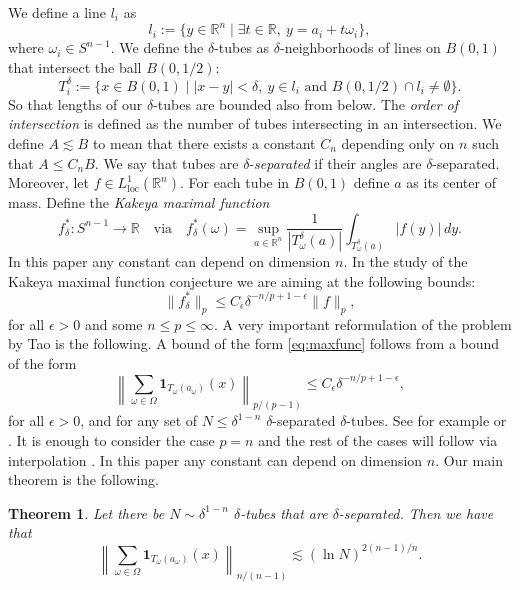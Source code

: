 \documentclass[11pt, letterpaper]{nyjm}
\newtheorem{theorem}{Theorem}[section]
\newcommand{\R}{\mathbb{R}}
\begin{document}
	We define a line $l_i$ as
	\[
	l_i := \{ y \in \R^n \mid \exists t \in \R,\ y = a_i + t\omega_i \},
	\]
	where $\omega_i \in S^{n-1}.$
	We define the $\delta$-tubes as $\delta$-neighborhoods of lines on $B(0,1)$ that
	intersect the ball $B(0, 1/2)$:
	\[
	T^{\delta}_i := \{ x \in B(0,1) \mid |x - y| < \delta,\ y \in l_i
	\text{ and } B(0,1/2) \cap l_i \neq \emptyset \}.
	\]
	So that lengths of our $\delta$-tubes are bounded also from below. The
	\emph{order of intersection} is defined as the number of tubes intersecting in an
	intersection. We define $A \lesssim B$ to mean that there exists a constant $C_n$
	depending only on $n$ such that $A \leq C_n B$. We say that tubes are
	$\delta$-\emph{separated} if their angles are $\delta$-separated. Moreover, let
	$f \in L^1_{\mathrm{loc}}(\R^n)$. For each tube in $B(0,1)$ define $a$ as its
	center of mass. Define the \emph{Kakeya maximal function}
	\[
	f^*_\delta : S^{n-1} \to \R \quad \text{via} \quad
	f^*_\delta(\omega) = \sup_{a \in \R^n} \frac{1}{|T^{\delta}_\omega(a)|}
	\int_{T^{\delta}_\omega(a)} |f(y)|\, dy.
	\]
	In this paper any constant can depend on dimension $n$. In the study of the Kakeya
	maximal function conjecture we are aiming at the following bounds:
	\begin{equation}\label{eq:maxfunc}
		\| f^*_\delta \|_p \leq C_\epsilon \delta^{-n/p + 1 - \epsilon} \| f \|_p,
	\end{equation}
	for all $\epsilon > 0$ and some $n \leq p \leq \infty$. A very important
	reformulation of the problem by Tao is the following. A bound of the form
	\eqref{eq:maxfunc} follows from a bound of the form
	\begin{equation}\label{eq:tao}
		\left\| \sum_{\omega \in \Omega} \mathbf{1}_{T_\omega(a_\omega)}(x) \right\|_{p/(p-1)}
		\leq C_\epsilon \delta^{-n/p + 1 - \epsilon},
	\end{equation}
	for all $\epsilon > 0$, and for any set of $N \leq \delta^{1-n}$ $\delta$-separated
	$\delta$-tubes. See for example \cite{Kroc} or \cite{Tao99}. It is enough to
	consider the case $p = n$ and the rest of the cases will follow via interpolation
	\cite{Kroc, Tao99}. In this paper any constant can depend on dimension $n$. Our
	main theorem is the following.
	
	\begin{theorem}\label{thm:main}
		Let there be $N \sim \delta^{1-n}$ $\delta$-tubes that are $\delta$-separated.
		Then we have that
		\[
		\left\| \sum_{\omega \in \Omega} \mathbf{1}_{T_\omega(a_\omega)}(x)
		\right\|_{n/(n-1)} \lesssim (\ln N)^{2(n-1)/n}.
		\]
	\end{theorem}
	
\end{document}
